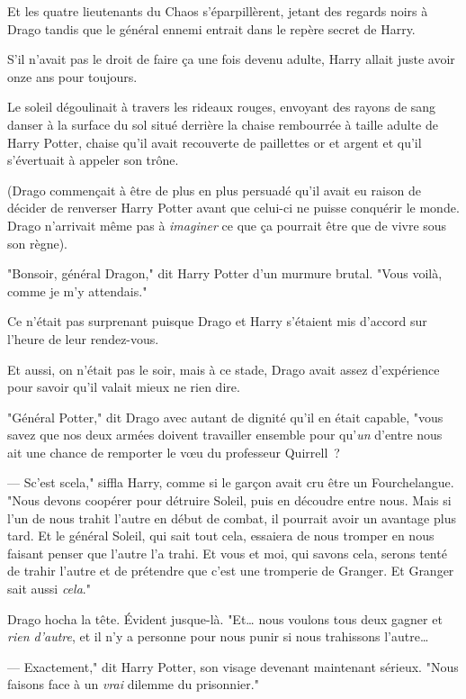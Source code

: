 Et les quatre lieutenants du Chaos s'éparpillèrent, jetant des regards noirs à Drago tandis que le général ennemi entrait dans le repère secret de Harry.

S'il n'avait pas le droit de faire ça une fois devenu adulte, Harry allait juste avoir onze ans pour toujours.

\later

Le soleil dégoulinait à travers les rideaux rouges, envoyant des rayons de sang danser à la surface du sol situé derrière la chaise rembourrée à taille adulte de Harry Potter, chaise qu'il avait recouverte de paillettes or et argent et qu'il s'évertuait à appeler son trône.

(Drago commençait à être de plus en plus persuadé qu'il avait eu raison de décider de renverser Harry Potter avant que celui-ci ne puisse conquérir le monde. Drago n'arrivait même pas à \emph{imaginer} ce que ça pourrait être que de vivre sous son règne).

"Bonsoir, général Dragon," dit Harry Potter d'un murmure brutal. "Vous voilà, comme je m'y attendais."

Ce n'était pas surprenant puisque Drago et Harry s'étaient mis d'accord sur l'heure de leur rendez-vous.

Et aussi, on n'était pas le soir, mais à ce stade, Drago avait assez d'expérience pour savoir qu'il valait mieux ne rien dire.

"Général Potter," dit Drago avec autant de dignité qu'il en était capable, "vous savez que nos deux armées doivent travailler ensemble pour qu'\emph{un} d'entre nous ait une chance de remporter le vœu du professeur Quirrell~?

--- Sc'est scela," siffla Harry, comme si le garçon avait cru être un Fourchelangue. "Nous devons coopérer pour détruire Soleil, puis en découdre entre nous. Mais si l'un de nous trahit l'autre en début de combat, il pourrait avoir un avantage plus tard. Et le général Soleil, qui sait tout cela, essaiera de nous tromper en nous faisant penser que l'autre l'a trahi. Et vous et moi, qui savons cela, serons tenté de trahir l'autre et de prétendre que c'est une tromperie de Granger. Et Granger sait aussi \emph{cela}."

Drago hocha la tête. Évident jusque-là. "Et… nous voulons tous deux gagner et \emph{rien d'autre}, et il n'y a personne pour nous punir si nous trahissons l'autre…

--- Exactement," dit Harry Potter, son visage devenant maintenant sérieux. "Nous faisons face à un \emph{vrai} dilemme du prisonnier."

